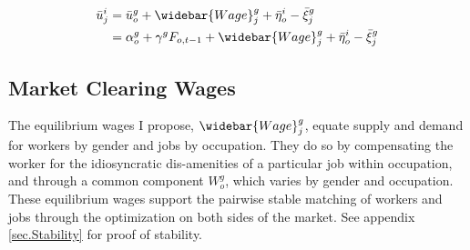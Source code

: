 \documentclass[12pt]{article}
\begin{document}
\begin{align*}
\bar{u}^{i}_j &= \bar{u}^{g}_o + \widebar{Wage}^g_j   + \bar{\eta}^i_o - \bar{\xi}^g_j \\
    &= \alpha^g_o +   \gamma^g F_{o,t-1} + \widebar{Wage}^g_j   + \bar{\eta}^i_o - \bar{\xi}^g_j
\end{align*}



\subsection{Market Clearing Wages}






The equilibrium wages I propose, $\widebar{Wage}^g_j$, equate supply and demand for workers by gender and jobs by occupation. They do so by compensating the worker for the idiosyncratic dis-amenities of a particular job within occupation, and through a common component $W^g_o$, which varies by gender and occupation. These equilibrium wages support the pairwise stable matching of workers and jobs through the optimization on both sides of the market. See appendix \ref{sec.Stability} for proof of stability.
\end{document}
